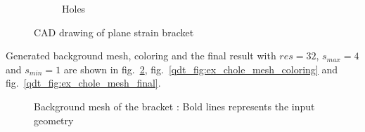\begin{figure}[H]
\begin{subfigure}[b]{0.4\linewidth}
        \end{subfigure}
        \begin{subfigure}[b]{0.4\linewidth}
            \caption{Holes}
        \end{subfigure}
        \caption{CAD drawing of plane strain bracket}
        \label{qdt_fig:ex_bracket_cad}
    \end{figure}
Generated background mesh, coloring and the final result with $res=32$, $s_{max}=4$ and $s_{min}=1$ are shown in fig.~\ref{qdt_fig:ex_chole_background_mesh}, fig.~\ref{qdt_fig:ex_chole_mesh_coloring} and fig.~\ref{qdt_fig:ex_chole_mesh_final}.
\begin{figure}
    \centering
    \caption[Background mesh of the bracket]{Background mesh of the bracket : Bold lines represents the input geometry}
    \label{qdt_fig:ex_chole_background_mesh}
\end{figure}

